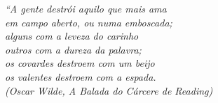\begin{epigrafe}
    \vspace*{\fill}
	\begin{flushright}
		\textit{``A gente destrói aquilo que mais ama\\
em campo aberto, ou numa emboscada;\\
alguns com a leveza do carinho\\
outros com a dureza da palavra;\\
os covardes destroem com um beijo\\
os valentes destroem com a espada.\\
		(Oscar Wilde, A Balada do Cárcere de Reading)}
	\end{flushright}
\end{epigrafe}
